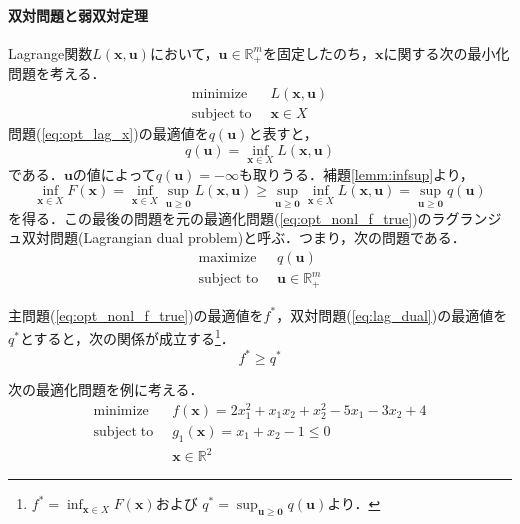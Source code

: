 \documentclass{jsreport}
\begin{document}
\paragraph{双対問題と弱双対定理}
Lagrange関数$L(\bm{x}, \bm{u})$において，$\bm{u} \in \mathbb{R}_{+}^m$を固定したのち，$\bm{x}$に関する次の最小化問題を考える．
\begin{align}\label{eq:opt_lag_x}
  \mathrm{minimize} \; \; &L(\bm{x}, \bm{u}) \nonumber \\
  \mathrm{subject \; to} \; \; &\bm{x} \in X
\end{align}
問題(\ref{eq:opt_lag_x})の最適値を$q(\bm{u})$と表すと，
\begin{equation}\label{eq:qu}
  q(\bm{u}) = \inf_{\bm{x} \in X} L(\bm{x}, \bm{u})
\end{equation}
である．$\bm{u}$の値によって$q(\bm{u}) = -\infty$も取りうる．補題\ref{lemm:infsup}より，
\begin{equation}\label{eq:infsup}
  \inf_{\bm{x} \in X} F(\bm{x}) = \inf_{\bm{x} \in X} \sup_{\bm{u} \geq \bm{0}} L(\bm{x}, \bm{u}) \geq
  \sup_{\bm{u} \geq \bm{0}} \inf_{\bm{x} \in X} L(\bm{x},\bm{u}) = \sup_{\bm{u}
  \geq \bm{0}} q(\bm{u})
\end{equation}
を得る．この最後の問題を元の最適化問題(\ref{eq:opt_nonl_f_true})のラグランジュ双対問題(Lagrangian dual problem)と呼ぶ．つまり，次の問題である．
\begin{align}\label{eq:lag_dual}
  \mathrm{maximize} \; \; &q(\bm{u}) \nonumber \\
  \mathrm{subject \; to} \; \; &\bm{u} \in \mathbb{R}_{+}^m
\end{align}


\begin{theo}\label{theo:weak_dual}
  主問題(\ref{eq:opt_nonl_f_true})の最適値を$f^{*}$，双対問題(\ref{eq:lag_dual})の最適値を$q^{*}$とすると，次の関係が成立する\footnote{
  $f^{*} = \inf_{\bm{x} \in X} F(\bm{x})$および
  $q^{*} = \sup_{\bm{u} \geq \bm{0}} q(\bm{u})$より．
  }．
  \begin{equation}
    f^{*} \geq q^{*} \nonumber
  \end{equation}
\end{theo}

次の最適化問題を例に考える．
\begin{align}
  \mathrm{minimize} \; \; &f(\bm{x}) = 2x_1^2 + x_1x_2 + x_2^2 - 5x_1 - 3x_2 + 4 \nonumber\\
  \mathrm{subject \; to} \; \; &g_1(\bm{x}) = x_1 + x_2 -1 \leq 0 \nonumber \\
  &\bm{x} \in \mathbb{R}^2 \nonumber
\end{align}
\end{document}
